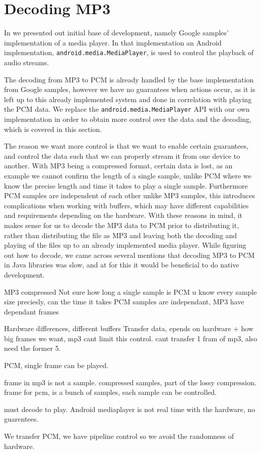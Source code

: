 \section{Decoding MP3}
In  we presented out initial base of development, namely Google samples' implementation of a media player.
In that implementation an Android implementation, \texttt{android.media.MediaPlayer}, is used to control the playback of audio streams.

The decoding from MP3 to \ac{PCM} is already handled by the base implementation from Google samples, however we have no guarantees when actions occur, as it is left up to this already implemented system and done in correlation with playing the \ac{PCM} data.
We replace the \texttt{android.media.MediaPlayer} API with our own implementation in order to obtain more control over the data and the decoding, which is covered in this section.

The reason we want more control is that we want to enable certain guarantees, and control the data such that we can properly stream it from one device to another.
With MP3 being a compressed format, certain data is lost, as an example we cannot confirm the length of a single sample, unlike PCM where we know the precise length and time it takes to play a single sample.
Furthermore \ac{PCM} samples are independent of each other unlike MP3 samples, this introduces complications when working with buffers, which may have different capabilities and requirements depending on the hardware.
With these reasons in mind, it makes sense for us to decode the MP3 data to \ac{PCM} prior to distributing it, rather than distributing the file as MP3 and leaving both the decoding and playing of the files up to an already implemented media player.
\bigskip
While figuring out how to decode, we came across several mentions that decoding MP3 to \ac{PCM} in Java libraries was slow, and at for this it would be beneficial to do native development\cite{slow_java_stackoverflow}\cite{slow_java_lib}.
%

MP3 compressed
Not sure how long a single sample is
PCM u know every sample size preciesly, can the time it takes
PCM samples are independant, MP3 have dependant frames

Hardware differences, different buffers
Transfer data, epends on hardware + how big frames we want, mp3 cant limit this control.
cant transfer 1 fram of mp3, also need the former 5.

PCM, single frame can be played.


frame in mp3 is not a sample. compressed samples, part of the lossy compression.
frame for pcm, is a bunch of samples, each sample can be controlled.

must decode to play.
Android mediaplayer is not real time with the hardware, no guarentees.

We transfer PCM, we have pipeline control so we avoid the randomness of hardware.
